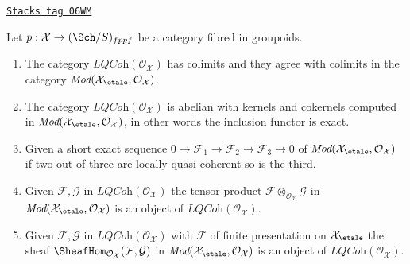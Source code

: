 \begin{lemma}
\label{stacks-sheaves-lemma-lqc-colimits}
\href{https://stacks.math.columbia.edu/tag/06WM}{\texttt{Stacks tag 06WM}}

Let $p : \mathcal{X} \to (\Sch/S)_{fppf}$ be a category fibred in
groupoids.
\begin{enumerate}
\item The category $\textit{LQCoh}(\mathcal{O}_\mathcal{X})$
has colimits and they agree with colimits in the category
$\textit{Mod}(\mathcal{X}_\etale, \mathcal{O}_\mathcal{X})$.
\item The category $\textit{LQCoh}(\mathcal{O}_\mathcal{X})$
is abelian with kernels and cokernels computed in
$\textit{Mod}(\mathcal{X}_\etale, \mathcal{O}_\mathcal{X})$,
in other words the inclusion functor is exact.
\item Given a short exact sequence
$0 \to \mathcal{F}_1 \to \mathcal{F}_2 \to \mathcal{F}_3 \to 0$ of
$\textit{Mod}(\mathcal{X}_\etale, \mathcal{O}_\mathcal{X})$
if two out of three are locally quasi-coherent so is the third.
\item Given $\mathcal{F}, \mathcal{G}$ in
$\textit{LQCoh}(\mathcal{O}_\mathcal{X})$
the tensor product $\mathcal{F} \otimes_{\mathcal{O}_\mathcal{X}} \mathcal{G}$
in $\textit{Mod}(\mathcal{X}_\etale, \mathcal{O}_\mathcal{X})$
is an object of $\textit{LQCoh}(\mathcal{O}_\mathcal{X})$.
\item Given $\mathcal{F}, \mathcal{G}$ in
$\textit{LQCoh}(\mathcal{O}_\mathcal{X})$
with $\mathcal{F}$ of finite presentation on
$\mathcal{X}_\etale$ the sheaf
$\SheafHom_{\mathcal{O}_\mathcal{X}}(\mathcal{F}, \mathcal{G})$
in $\textit{Mod}(\mathcal{X}_\etale, \mathcal{O}_\mathcal{X})$
is an object of $\textit{LQCoh}(\mathcal{O}_\mathcal{X})$.
\end{enumerate}
\end{lemma}

